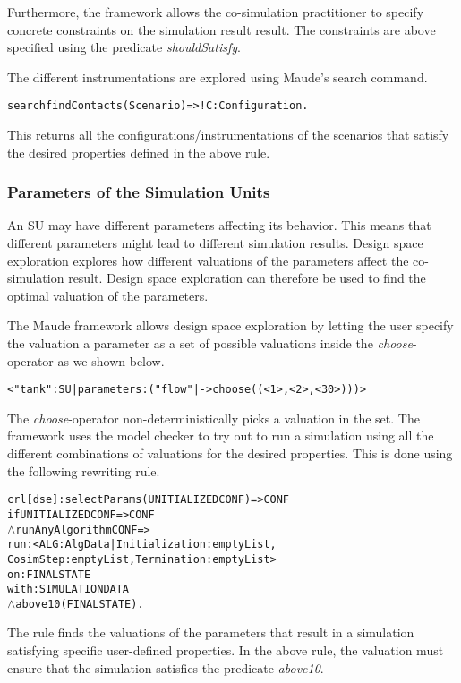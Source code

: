 Furthermore, the framework allows the co-simulation practitioner to specify concrete constraints on the simulation result result.
The constraints are above specified using the predicate \emph{shouldSatisfy}.

The different instrumentations are explored using Maude's search command.

\begin{alltt}
  \small
  search findContacts(Scenario) =>! C:Configuration .
\end{alltt}
  
This returns all the configurations/instrumentations of the scenarios that satisfy the desired properties defined in the above rule.

\subsubsection{Parameters of the Simulation Units}
An SU may have different parameters affecting its behavior.
This means that different parameters might lead to different simulation results.
Design space exploration explores how different valuations of the parameters affect the co-simulation result.
Design space exploration can therefore be used to find the optimal valuation of the parameters. 

The Maude framework allows design space exploration by letting the user specify the valuation a parameter as a set of possible valuations inside the \emph{choose}-operator as we shown below.
\begin{alltt}
  \small
< "tank" : SU | parameters : ("flow" |-> choose((< 1 >,< 2 >,< 30 >))) >
\end{alltt}

The \emph{choose}-operator non-deterministically picks a valuation in the set.
The framework uses the model checker to try out to run a simulation using all the different combinations of valuations for the desired properties.
This is done using the following rewriting rule.

\begin{alltt}
  \small
  crl [dse] : selectParams(UNITIALIZEDCONF) => CONF 
  if UNITIALIZEDCONF => CONF
  \(\land\) runAnyAlgorithm CONF => 
      run: < ALG : AlgData | Initialization : emptyList, 
      CosimStep : emptyList, Termination : emptyList > 
      on: FINALSTATE
      with: SIMULATIONDATA
  \(\land\) above10(FINALSTATE) .
\end{alltt}

The rule finds the valuations of the parameters that result in a simulation satisfying specific user-defined properties.
In the above rule, the valuation must ensure that the simulation satisfies the predicate \emph{above10}.

